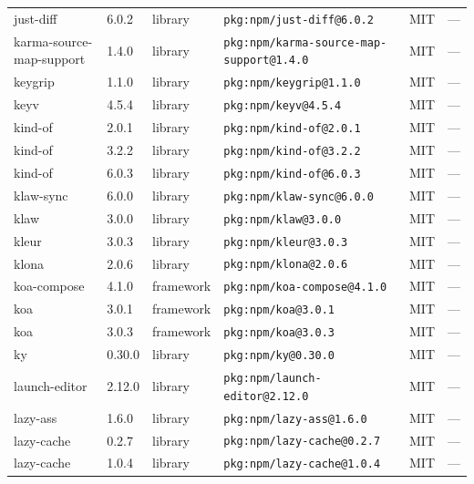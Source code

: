 \documentclass[11pt,a4paper]{article}
\begin{document}
\begin{longtable}{|p{4cm}|p{2cm}|p{1.6cm}|p{5cm}|p{1.5cm}|p{3.5cm}|}
\raggedright just-diff & 6.0.2 & library & \small\texttt{pkg:npm/just-diff@6.0.2} & MIT & \small — \\
\raggedright karma-source-map-support & 1.4.0 & library & \small\texttt{pkg:npm/karma-source-map-support@1.4.0} & MIT & \small — \\
\raggedright keygrip & 1.1.0 & library & \small\texttt{pkg:npm/keygrip@1.1.0} & MIT & \small — \\
\raggedright keyv & 4.5.4 & library & \small\texttt{pkg:npm/keyv@4.5.4} & MIT & \small — \\
\raggedright kind-of & 2.0.1 & library & \small\texttt{pkg:npm/kind-of@2.0.1} & MIT & \small — \\
\raggedright kind-of & 3.2.2 & library & \small\texttt{pkg:npm/kind-of@3.2.2} & MIT & \small — \\
\raggedright kind-of & 6.0.3 & library & \small\texttt{pkg:npm/kind-of@6.0.3} & MIT & \small — \\
\raggedright klaw-sync & 6.0.0 & library & \small\texttt{pkg:npm/klaw-sync@6.0.0} & MIT & \small — \\
\raggedright klaw & 3.0.0 & library & \small\texttt{pkg:npm/klaw@3.0.0} & MIT & \small — \\
\raggedright kleur & 3.0.3 & library & \small\texttt{pkg:npm/kleur@3.0.3} & MIT & \small — \\
\raggedright klona & 2.0.6 & library & \small\texttt{pkg:npm/klona@2.0.6} & MIT & \small — \\
\raggedright koa-compose & 4.1.0 & framework & \small\texttt{pkg:npm/koa-compose@4.1.0} & MIT & \small — \\
\raggedright koa & 3.0.1 & framework & \small\texttt{pkg:npm/koa@3.0.1} & MIT & \small — \\
\raggedright koa & 3.0.3 & framework & \small\texttt{pkg:npm/koa@3.0.3} & MIT & \small — \\
\raggedright ky & 0.30.0 & library & \small\texttt{pkg:npm/ky@0.30.0} & MIT & \small — \\
\raggedright launch-editor & 2.12.0 & library & \small\texttt{pkg:npm/launch-editor@2.12.0} & MIT & \small — \\
\raggedright lazy-ass & 1.6.0 & library & \small\texttt{pkg:npm/lazy-ass@1.6.0} & MIT & \small — \\
\raggedright lazy-cache & 0.2.7 & library & \small\texttt{pkg:npm/lazy-cache@0.2.7} & MIT & \small — \\
\raggedright lazy-cache & 1.0.4 & library & \small\texttt{pkg:npm/lazy-cache@1.0.4} & MIT & \small — \\

\end{longtable}
\end{document}
